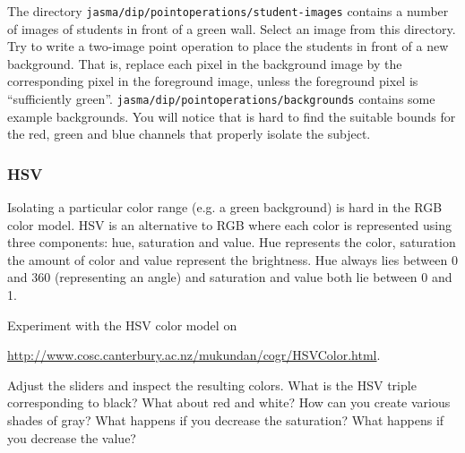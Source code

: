 \documentclass{book}
\begin{document}
\begin{exercise}
The directory \texttt{jasma/dip/pointoperations/student-images} contains a number of images of students in front of a green wall. Select an image from this directory. Try to write a two-image point operation to place the students in front of a new background. That is, replace each pixel in the background image by the corresponding pixel in the foreground image, unless the foreground pixel is ``sufficiently green''.  \texttt{jasma/dip/pointoperations/backgrounds} contains some example backgrounds. You will notice that is hard to find the suitable bounds for the red, green and blue channels that properly isolate the subject.
\end{exercise}

\subsubsection*{HSV}
Isolating a particular color range (e.g. a green background) is hard in the RGB color model. HSV is an alternative to RGB where each color is represented using three components: hue, saturation and value. Hue represents the color, saturation the amount of color and value represent the brightness. Hue always lies between 0 and 360 (representing an angle) and saturation and value both lie between 0 and 1.

\begin{exercise}
Experiment with the HSV color model on

 \href{http://www.cosc.canterbury.ac.nz/mukundan/cogr/HSVColor.html}{http://www.cosc.canterbury.ac.nz/mukundan/cogr/HSVColor.html}. 
 
Adjust the sliders and inspect the resulting colors. What is the HSV triple corresponding to black? What about red and white? How can you create various shades of gray? What happens if you decrease the saturation? What happens if you decrease the value?
\end{exercise}
\end{document}
